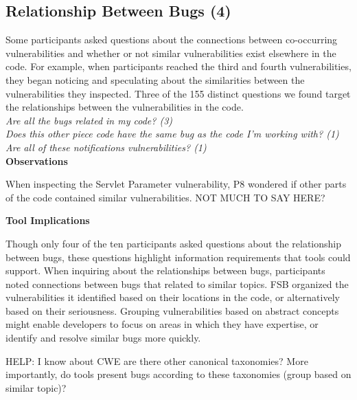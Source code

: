 \documentclass[conference]{IEEEtran}
\begin{document}

\noindent\subsection{\textbf{Relationship Between Bugs (4)}}\label{rbb}

Some participants asked questions about the connections between co-occurring vulnerabilities and whether or not similar vulnerabilities exist elsewhere in the code. 
For example, when participants reached the third and fourth vulnerabilities, they began noticing and speculating about the similarities between the vulnerabilities they inspected.
Three of the 155 distinct questions we found target the relationships between the vulnerabilities in the code. 
\\

\noindent\emph{Are all the bugs related in my code? (3)} \\
\emph{Does this other piece code have the same bug as the code I'm working with? (1)} \\
\emph{Are all of these notifications vulnerabilities? (1)} \\


\noindent\textbf{Observations}

When inspecting the Servlet Parameter vulnerability, P8 wondered if other parts of the code contained similar vulnerabilities.
NOT MUCH TO SAY HERE?

\noindent\textbf{Tool Implications}

Though only four of the ten participants asked questions about the relationship between bugs, these questions highlight information requirements that tools could support.
When inquiring about the relationships between bugs, participants noted connections between bugs that related to similar topics.
FSB organized the vulnerabilities it identified based on their locations in the code, or alternatively based on their seriousness.
Grouping vulnerabilities based on abstract concepts might enable developers to focus on areas in which they have expertise, or identify and resolve similar bugs more quickly.

HELP: I know about CWE are there other canonical taxonomies? More importantly, do tools present bugs according to these taxonomies (group based on similar topic)?
\end{document}
